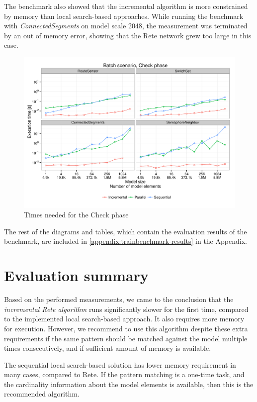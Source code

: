 The benchmark also showed that the incremental algorithm is more constrained by memory than local search-based approaches. While running the benchmark with \emph{ConnectedSegments} on model scale 2048, the measurement was terminated by an out of memory error, showing that the Rete network grew too large in this case.

\begin{figure}[htpb]
	\centering
	\includegraphics[width=\linewidth]{pdfs/Batch-Check-phase.pdf}
	\caption{Times needed for the Check phase}
	\label{fig:tb-check}
\end{figure}


The rest of the diagrams and tables, which contain the evaluation results of the benchmark, are included in \autoref{appendix:trainbenchmark-results} in the Appendix.

\section{Evaluation summary}

Based on the performed measurements, we came to the conclusion that the \emph{incremental Rete algorithm} runs significantly slower for the first time, compared to the implemented local search-based approach. It also requires more memory for execution. However, we recommend to use this algorithm despite these extra requirements if the same pattern should be matched against the model multiple times consecutively, and if sufficient amount of memory is available.

The sequential local search-based solution has lower memory requirement in many cases, compared to Rete. If the pattern matching is a one-time task, and the cardinality information about the model elements is available, then this is the recommended algorithm.


